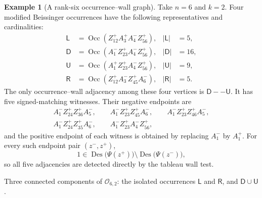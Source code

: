 \documentclass[11pt]{article}
\theoremstyle{definition}
\newtheorem{example}[theorem]{Example}
\theoremstyle{remark}
\newcommand{\Des}{\operatorname{Des}}
\newcommand{\Occ}{\operatorname{Occ}}
\newcommand{\cO}{\mathcal O}
\begin{document}
\begin{example}[A rank-six occurrence--wall graph]
\label{ex:rank-six-graph}
Take $n=6$ and $k=2$.  Four modified Beissinger occurrences have the
following representatives and cardinalities:
\begin{align*}
 \mathsf L&=\Occ(Z_{12}^+A_3^+A_4^-Z_{56}^+),&|\mathsf L|&=5,\\
 \mathsf D&=\Occ(A_1^-Z_{23}^+A_4^-Z_{56}^+),&|\mathsf D|&=16,\\
 \mathsf U&=\Occ(A_1^+Z_{23}^+A_4^-Z_{56}^+),&|\mathsf U|&=9,\\
 \mathsf R&=\Occ(Z_{12}^+A_3^-Z_{45}^+A_6^-),&|\mathsf R|&=5.
\end{align*}
The only occurrence--wall adjacency among these four vertices is
$\mathsf D--\mathsf U$.  It has five signed-matching witnesses.  Their
negative endpoints are
\begin{gather*}
 A_1^-Z_{24}^+Z_{36}^+A_5^-,\qquad
 A_1^-Z_{23}^+Z_{45}^+A_6^-,\qquad
 A_1^-Z_{23}^+Z_{46}^+A_5^-,\\
 A_1^-Z_{24}^+Z_{35}^+A_6^-,\qquad
 A_1^-Z_{23}^+A_4^-Z_{56}^+,
\end{gather*}
and the positive endpoint of each witness is obtained by replacing
$A_1^-$ by $A_1^+$.  For every such endpoint pair $(z^-,z^+)$,
\[
 1\in\Des\bigl(\Psi(z^+)\bigr)
       \setminus\Des\bigl(\Psi(z^-)\bigr),
\]
so all five adjacencies are detected directly by the tableau wall test.

\begin{center}

\smallskip
{\small Three connected components of $\cO_{6,2}$: the isolated
occurrences $\mathsf L$ and $\mathsf R$, and
$\mathsf D\cup\mathsf U$.}
\end{center}


\end{example}
\end{document}
